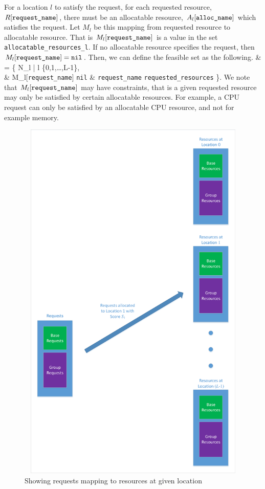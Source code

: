 \documentclass[12pt,onecolumn]{IEEEtran}
\newcommand{\bus}{\_\allowbreak}
\begin{document}
For a location $l$ to satisfy the request, for each requested resource,
$R[\texttt{request{\bus}name}]$, there must be an allocatable resource,
$A_l[\texttt{alloc{\bus}name}]$ which satisfies the request.
Let $M_l$ be this mapping from requested resource to allocatable resource.
That is $M_l[\texttt{request{\bus}name}]$ is a value in the
set \texttt{allocatable{\bus}resources{\bus}l}.
If no allocatable resource specifies the request, then
$M_l[\texttt{request{\bus}name}] = \texttt{nil}$.
Then, we can define the feasible set as the following.
\bea
&  = \{
N_l | l \in \{0,1,\dots,L-1\}, \nn \\
& \hspace{.2in} M_l[\texttt{request{\bus}name}] \neq \texttt{nil}
& \forall \texttt{request{\bus}name} \in \texttt{requested{\bus}resources}
\}.
\eea
We note that $M_l[\texttt{request{\bus}name}]$ may have constraints, that
is a given requested resource may only be satisfied by certain allocatable
resources.  
For example, a CPU request can only be satisfied by
an allocatable CPU resource, and not for example memory.

\begin{figure}  
\begin{center}  
\includegraphics[height=7in,width=6in]{req1.pdf}
\caption{Showing requests mapping to resources at 
given location\label{fig:req1}}
\end{center}  
\end{figure}  
\end{document}
